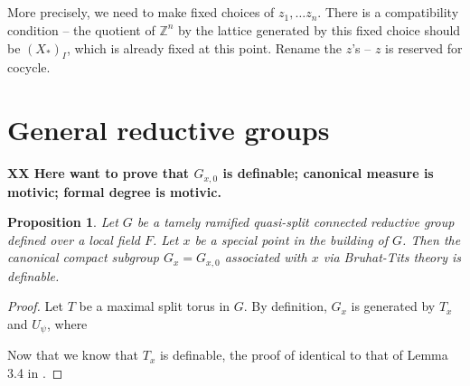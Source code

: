 \documentclass{amsart}
\newcommand{\Z}{{\mathbb Z}}
\theoremstyle{plain}
\newtheorem{prop}[thm]{Proposition}
\theoremstyle{definition}
\begin{document}
\subsection{}More precisely, we need to make fixed choices of $z_1, \dots z_n$. 
There is a compatibility condition -- the quotient of $\Z^n$ by the lattice generated by this fixed choice should be $(X_\ast)_I$, which is already fixed at this point. 
Rename the $z$'s -- $z$ is reserved for cocycle.  

\section{General reductive groups}
{\bf XX Here want to prove that $G_{x, 0}$ is definable; canonical measure is motivic; formal degree is motivic. }
\begin{prop} Let $G$ be a tamely ramified quasi-split connected reductive group defined over a local field $F$. 
Let $x$ be a special point in the building of $G$. 
Then the canonical compact subgroup $G_x=G_{x, 0}$ associated with $x$ via Bruhat-Tits theory is definable. 
\end{prop}
\begin{proof} Let $T$ be a maximal split torus in $G$.
By definition, $G_x$ is generated by $T_x$ and $U_\psi$, where 
 
Now that we know that $T_x$ is definable, the proof of identical to that of Lemma 3.4 in \cite{CGH-2}.  
\end{proof} 
\end{document}
